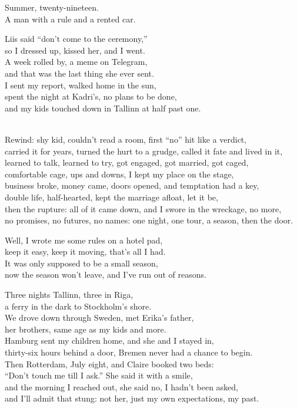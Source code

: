 \begin{lyrics}
Summer, twenty-nineteen.\\
A man with a rule and a rented car.

Liis said “don’t come to the ceremony,”\\
so I dressed up, kissed her, and I went.\\
A week rolled by, a meme on Telegram,\\
and that was the last thing she ever sent.\\
I sent my report, walked home in the sun,\\
spent the night at Kadri’s, no plans to be done,\\
and my kids touched down in Tallinn at half past one.

\\
Rewind: shy kid, couldn’t read a room, first “no” hit like a verdict,\\
carried it for years, turned the hurt to a grudge, called it fate and lived in it,\\
learned to talk, learned to try, got engaged, got married, got caged,\\
comfortable cage, ups and downs, I kept my place on the stage,\\
business broke, money came, doors opened, and temptation had a key,\\
double life, half-hearted, kept the marriage afloat, let it be,\\
then the rupture: all of it came down, and I swore in the wreckage, no more,\\
no promises, no futures, no names: one night, one tour, a season, then the door.

Well, I wrote me some rules on a hotel pad,\\
keep it easy, keep it moving, that’s all I had.\\
It was only supposed to be a small season,\\
now the season won’t leave, and I’ve run out of reasons.

Three nights Tallinn, three in Riga,\\
a ferry in the dark to Stockholm’s shore.\\
We drove down through Sweden, met Erika’s father,\\
her brothers, same age as my kids and more.\\
Hamburg sent my children home, and she and I stayed in,\\
thirty-six hours behind a door, Bremen never had a chance to begin.\\
Then Rotterdam, July eight, and Claire booked two beds:\\
“Don’t touch me till I ask.” She said it with a smile,\\
and the morning I reached out, she said no, I hadn’t been asked,\\
and I’ll admit that stung: not her, just my own expectations, my past.


\end{lyrics}
